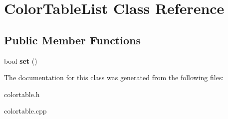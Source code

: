 \hypertarget{classColorTableList}{
\section{ColorTableList Class Reference}
\label{classColorTableList}
}
\subsection*{Public Member Functions}
\begin{DoxyCompactItemize}
\item 
\hypertarget{classColorTableList_adf303cf09c4a760a0f21b2cb89c3c78f}{
bool {\bfseries set} ()}
\label{classColorTableList_adf303cf09c4a760a0f21b2cb89c3c78f}

\end{DoxyCompactItemize}


The documentation for this class was generated from the following files:\begin{DoxyCompactItemize}
\item 
colortable.h\item 
colortable.cpp\end{DoxyCompactItemize}
